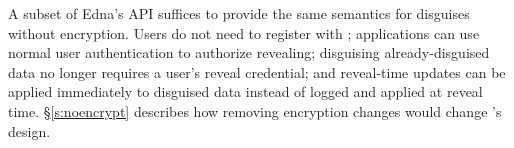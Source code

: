 %
A subset of Edna's API suffices to provide the same semantics for disguises
without encryption. Users do not need to register with \sys; applications can
use normal user authentication to authorize revealing; disguising
already-disguised data no longer requires a user's reveal credential; and
reveal-time updates can be applied immediately to disguised data instead of
logged and applied at reveal time.
%
\S\ref{s:noencrypt} describes how removing encryption changes would
change \sys's design.

%
%
